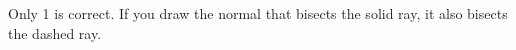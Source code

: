 Only 1 is correct. If you draw the normal that bisects the solid ray, it
also bisects the dashed ray.



